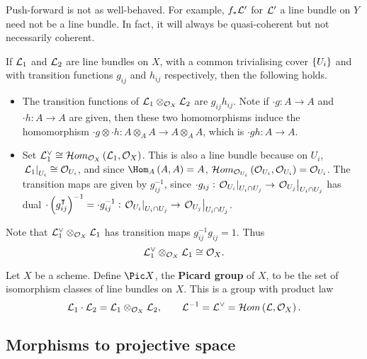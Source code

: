 \begin{remark*}
Push-forward is not as well-behaved. For example, $ f_*\mathcal{L}' $ for $ \mathcal{L}' $ a line bundle on $ Y $ need not be a line bundle. In fact, it will always be quasi-coherent but not necessarily coherent.
\end{remark*}

If $ \mathcal{L}_1 $ and $ \mathcal{L}_2 $ are line bundles on $ X $, with a common trivialising cover $ \cbr{U_i} $ and with transition functions $ g_{ij} $ and $ h_{ij} $ respectively, then the following holds.
\begin{itemize}
\item The transition functions of $ \mathcal{L}_1 \otimes_{\mathcal{O}_X} \mathcal{L}_2 $ are $ g_{ij}h_{ij} $. Note if $ \cdot g : A \to A $ and $ \cdot h : A \to A $ are given, then these two homomorphisms induce the homomorphism $ \cdot g \otimes \cdot h : A \otimes_A A \to A \otimes_A A $, which is $ \cdot gh : A \to A $.
\item Set $ \LLL_1^\vee \cong \HOM_{\OOO_X}\br{\LLL_1, \OOO_X} $. This is also a line bundle because on $ U_i $, $ \left. \mathcal{L}_1 \right|_{U_i} \cong \mathcal{O}_{U_i} $, and since $ \Hom_A\br{A, A} = A $, $ \HOM_{\OOO_{U_i}}\br{\OOO_{U_i}, \OOO_{U_i}} = \OOO_{U_i} $. The transition maps are given by $ g_{ij}^{-1} $, since $ \cdot g_{ij} : \left. \mathcal{O}_{U_i} \right|_{U_i \cap U_j} \to \left. \mathcal{O}_{U_j} \right|_{U_i \cap U_j} $ has dual $ \cdot \br{g_{ij}^\intercal}^{-1} = \cdot g_{ij}^{-1} : \eval{\OOO_{U_i}}_{U_i \cap U_j} \to \eval{\OOO_{U_j}}_{U_i \cap U_j} $.
\end{itemize}
Note that $ \mathcal{L}_1^\vee \otimes_{\mathcal{O}_X} \mathcal{L}_1 $ has transition maps $ g_{ij}^{-1}g_{ij} = 1 $. Thus
$$ \mathcal{L}_1^\vee \otimes_{\mathcal{O}_X} \mathcal{L}_1 \cong \mathcal{O}_X. $$

\begin{definition*}
Let $ X $ be a scheme. Define $ \Pic X $, the \textbf{Picard group} of $ X $, to be the set of isomorphism classes of line bundles on $ X $. This is a group with product law
$$ \LLL_1 \cdot \LLL_2 = \LLL_1 \otimes_{\OOO_X} \LLL_2, \qquad \LLL^{-1} = \LLL^\vee = \HOM\br{\LLL, \OOO_X}. $$
\end{definition*}

\subsection{Morphisms to projective space}

